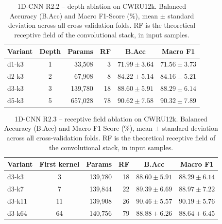 \begin{table}[ht]
\centering
\caption{1D-CNN R2.2 -- depth ablation on CWRU12k. Balanced Accuracy (B.Acc) and Macro F1-Score (\%), mean $\pm$ standard deviation across all cross-validation folds. RF is the theoretical receptive field of the convolutional stack, in input samples.}
\label{tab:ablation_cnn1d_depth_cwru12k}
\begin{tabular}{@{}l c r r c c@{}}
\toprule
\textbf{Variant} & \textbf{Depth} & \textbf{Params} & \textbf{RF} & \textbf{B.Acc} & \textbf{Macro F1} \\ \midrule
d1-k3 & 1 & 33,508 & 3 & $71.99 \pm 3.64$ & $71.56 \pm 3.73$ \\
d2-k3 & 2 & 67,908 & 8 & $84.22 \pm 5.14$ & $84.16 \pm 5.21$ \\
d3-k3 & 3 & 139,780 & 18 & $88.60 \pm 5.91$ & $88.29 \pm 6.14$ \\
d5-k3 & 5 & 657,028 & 78 & $90.62 \pm 7.58$ & $90.32 \pm 7.89$ \\
\bottomrule
\end{tabular}
\end{table}

\begin{table}[ht]
\centering
\caption{1D-CNN R2.3 -- receptive field ablation on CWRU12k. Balanced Accuracy (B.Acc) and Macro F1-Score (\%), mean $\pm$ standard deviation across all cross-validation folds. RF is the theoretical receptive field of the convolutional stack, in input samples.}
\label{tab:ablation_cnn1d_kernel_cwru12k}
\begin{tabular}{@{}l c r r c c@{}}
\toprule
\textbf{Variant} & \textbf{First kernel} & \textbf{Params} & \textbf{RF} & \textbf{B.Acc} & \textbf{Macro F1} \\ \midrule
d3-k3 & 3 & 139,780 & 18 & $88.60 \pm 5.91$ & $88.29 \pm 6.14$ \\
d3-k7 & 7 & 139,844 & 22 & $89.39 \pm 6.69$ & $88.97 \pm 7.22$ \\
d3-k11 & 11 & 139,908 & 26 & $90.46 \pm 5.57$ & $90.19 \pm 5.76$ \\
d3-k64 & 64 & 140,756 & 79 & $88.88 \pm 6.26$ & $88.64 \pm 6.45$ \\
\bottomrule
\end{tabular}
\end{table}

